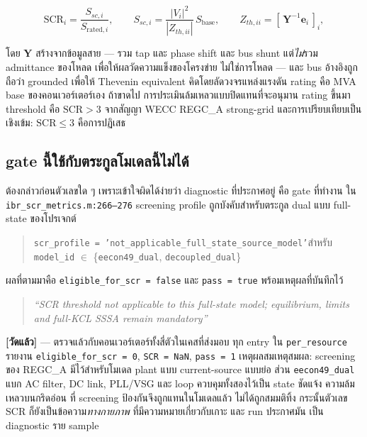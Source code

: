\documentclass[12pt,a4paper]{article}
\theoremstyle{remark}
\newcommand{\code}[1]{\texttt{\small #1}}
\newcommand{\measured}{\textcolor{ok}{\textbf{[วัดแล้ว]}}}
\begin{document}
\begin{equation}
\mathrm{SCR}_i = \frac{S_{sc,i}}{S_{\mathrm{rated},i}},
\qquad
S_{sc,i} = \frac{|V_i|^2}{|Z_{th,ii}|}\,S_{\text{base}},
\qquad
Z_{th,ii} = \left[\,\mathbf{Y}^{-1}\mathbf{e}_i\,\right]_i ,
\label{eq:scr}
\end{equation}

โดย $\mathbf{Y}$ สร้างจากข้อมูลสาย --- รวม tap และ phase shift และ bus shunt
แต่\emph{ไม่}รวม admittance ของโหลด เพื่อให้ผลวัดความแข็งของโครงข่าย
ไม่ใช่การโหลด --- และ bus อ้างอิงถูกถือว่า grounded เพื่อให้ Thevenin equivalent
คิดโดยลัดวงจรแหล่งแรงดัน rating คือ MVA base ของคอนเวอร์เตอร์เอง ถ้าขาดไป
การประเมินล้มเหลวแบบปิดแทนที่จะอนุมาน rating ขึ้นมา threshold คือ
$\mathrm{SCR} > 3$ จากสัญญา WECC REGC\_A strong-grid และการเปรียบเทียบเป็น
เชิงเข้ม: $\mathrm{SCR} \le 3$ คือการปฏิเสธ

\subsection{gate นี้ใช้กับตระกูลโมเดลนี้ไม่ได้}

ต้องกล่าวก่อนตัวเลขใด ๆ เพราะเข้าใจผิดได้ง่ายว่า diagnostic ที่ประกาศอยู่
คือ gate ที่ทำงาน ใน \code{ibr\_scr\_metrics.m:266--276} screening profile
ถูกบังคับสำหรับตระกูล dual แบบ full-state ของโปรเจกต์

\begin{quote}\small
\code{scr\_profile = 'not\_applicable\_full\_state\_source\_model'}\quad สำหรับ
\code{model\_id} $\in$ \{\code{eecon49\_dual}, \code{decoupled\_dual}\}
\end{quote}

ผลที่ตามมาคือ \code{eligible\_for\_scr = false} และ \code{pass = true}
พร้อมเหตุผลที่บันทึกไว้

\begin{quote}\itshape
``SCR threshold not applicable to this full-state model; equilibrium, limits and
full-KCL SSSA remain mandatory''
\end{quote}

\measured{} --- ตรวจแล้วกับคอนเวอร์เตอร์ทั้งสี่ตัวในเคสที่ส่งมอบ ทุก entry ใน
\code{per\_resource} รายงาน \code{eligible\_for\_scr = 0}, \code{SCR = NaN},
\code{pass = 1} เหตุผลสมเหตุสมผล: screening ของ REGC\_A มีไว้สำหรับโมเดล plant
แบบ current-source แบบย่อ ส่วน \code{eecon49\_dual} แบก AC filter, DC link,
PLL/VSG และ loop ควบคุมทั้งสองไว้เป็น state ชัดแจ้ง ความล้มเหลวบนกริดอ่อน
ที่ screening ป้องกันจึงถูกแทนในโมเดลแล้ว ไม่ได้ถูกสมมติทิ้ง กระนั้นตัวเลข SCR
ก็ยังเป็นข้อความ\emph{ทางกายภาพ} ที่มีความหมายเกี่ยวกับเกาะ และ run ประกาศมัน
เป็น diagnostic ราย sample
\end{document}
